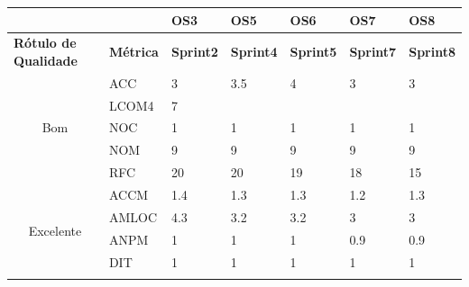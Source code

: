 \begin{table}[H]
\center
\begin{tabular}{|c|l|l|l|l|l|l|}
\hline
\multicolumn{1}{|l|}{\textbf{}}                    & \textbf{}        & \textbf{OS3}      & \textbf{OS5}      & \textbf{OS6}      & \textbf{OS7}      & \textbf{OS8}      \\ \hline
\multicolumn{1}{|l|}{\textbf{Rótulo de Qualidade}} & \textbf{Métrica} & \textbf{Sprint2} & \textbf{Sprint4} & \textbf{Sprint5} & \textbf{Sprint7} & \textbf{Sprint8} \\ \hline
\multirow{5}{*}{Bom}                               & ACC              & 3                 & 3.5               & 4                 & 3                 & 3                 \\ \cline{2-7} 
                                                   & LCOM4            & 7                 &                   &                   &                   &                   \\ \cline{2-7} 
                                                   & NOC              & 1                 & 1                 & 1                 & 1                 & 1                 \\ \cline{2-7} 
                                                   & NOM              & 9                 & 9                 & 9                 & 9                 & 9                 \\ \cline{2-7} 
                                                   & RFC              & 20                & 20                & 19                & 18                & 15                \\ \hline
\multirow{7}{*}{Excelente}                         & ACCM             & 1.4               & 1.3               & 1.3               & 1.2               & 1.3               \\ \cline{2-7} 
                                                   & AMLOC            & 4.3               & 3.2               & 3.2               & 3                 & 3                 \\ \cline{2-7} 
                                                   & ANPM             & 1                 & 1                 & 1                 & 0.9               & 0.9               \\ \cline{2-7} 
                                                   & DIT              & 1                 & 1                 & 1                 & 1                 & 1                 \\ \cline{2-7} 

\end{tabular}
\end{table}
